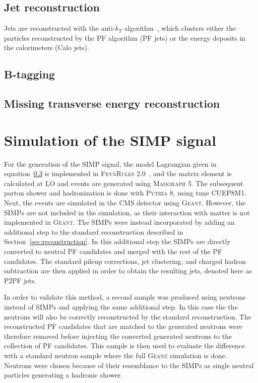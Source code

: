\subsection{Jet reconstruction}
\label{sec:jet_reconstruction}

Jets are reconstructed with the anti-$k_T$ algorithm~\cite{1126-6708-2008-04-063}, which clusters either the particles reconstructed by the \ac{PF} algorithm (\ac{PF} jets) or the energy deposits in the calorimeters (Calo jets). 


\subsection{B-tagging}



\subsection{Missing transverse energy reconstruction}



\section{Simulation of the SIMP signal}
\label{sec:SIMPs}

For the generation of the \ac{SIMP} signal, the model Lagrangian given in equation~\ref{} is implemented in \textsc{FeynRules 2.0}~\cite{Alloul:2013bka}, and the matrix element is calculated at \ac{LO} and events are generated using \textsc{Madgraph 5}. The subsequent parton shower and hadronization is done with \textsc{Pythia 8}, using tune CUEP8M1. Next, the events are simulated in the \ac{CMS} detector using \textsc{Geant}. However, the \acp{SIMP} are not included in the simulation, as their interaction with matter is not implemented in \textsc{Geant}. The \acp{SIMP} were instead incorporated by adding an additional step to the standard reconstruction described in Section~\ref{sec:reconstruction}. In this additional step the \acp{SIMP} are directly converted to neutral \ac{PF} candidates and merged with the rest of the \ac{PF} candidates. The standard pileup corrections, jet clustering, and charged hadron subtraction are then applied in order to obtain the resulting jets, denoted here as P2PF jets.

In order to validate this method, a second sample was produced using neutrons instead of \acp{SIMP} and applying the same additional step. In this case the the neutrons will also be correctly reconstructed by the standard reconstruction. The reconstructed \ac{PF} candidates that are matched to the generated neutrons were therefore removed before injecting the converted generated neutrons to the collection of \ac{PF} candidates. This sample is then used to evaluate the difference with a standard neutron sample where the full \textsc{Geant} simulation is done. Neutrons were chosen because of their resemblance to the \acp{SIMP} as single neutral particles generating a hadronic shower.

